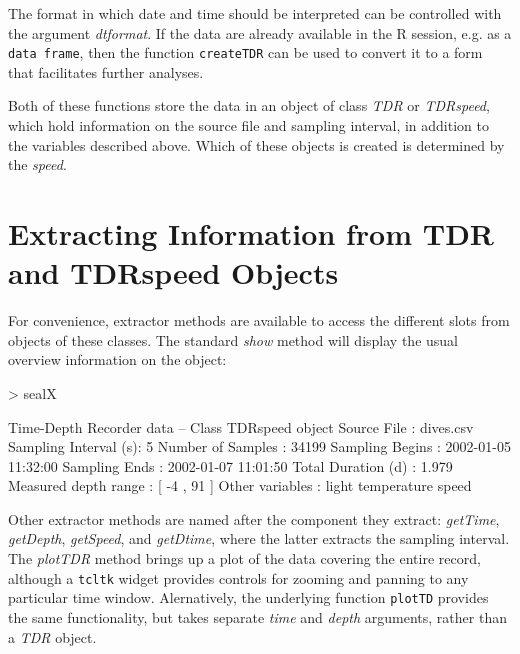 \documentclass[12pt, letterpaper]{scrartcl}
\newcommand{\Robject}[1]{{\texttt{#1}}}
\newcommand{\Rfunction}[1]{{\texttt{#1}}}
\newcommand{\Rpackage}[1]{{\texttt{#1}}}
\newcommand{\Rclass}[1]{{\textit{#1}}}
\newcommand{\Rmethod}[1]{{\textit{#1}}}
\newcommand{\Rfunarg}[1]{{\textit{#1}}}
\newcommand{\R}{{\normalfont\textsf{R }}{}}
\begin{document}
The format in which date and time should be interpreted can be controlled
with the argument \Rfunarg{dtformat}.  If the data are already available
in the \R{} session, e.g. as a \Robject{data frame}, then the function
\Rfunction{createTDR} can be used to convert it to a form that facilitates
further analyses.

Both of these functions store the data in an object of class \Rclass{TDR}
or \Rclass{TDRspeed}, which hold information on the source file and
sampling interval, in addition to the variables described above.  Which of
these objects is created is determined by the \Rfunarg{speed}.


\section{Extracting Information from TDR and TDRspeed Objects}
\label{sec:extract}

For convenience, extractor methods are available to access the different
slots from objects of these classes.  The standard \Rmethod{show} method
will display the usual overview information on the object:
\begin{Schunk}
\begin{Sinput}
> sealX
\end{Sinput}
\begin{Soutput}
Time-Depth Recorder data -- Class TDRspeed object
  Source File          : dives.csv 
  Sampling Interval (s): 5 
  Number of Samples    : 34199 
  Sampling Begins      : 2002-01-05 11:32:00 
  Sampling Ends        : 2002-01-07 11:01:50 
  Total Duration (d)   : 1.979 
  Measured depth range : [ -4 , 91 ]
  Other variables      : light temperature speed 
\end{Soutput}
\end{Schunk}

Other extractor methods are named after the component they extract:
\Rmethod{getTime}, \Rmethod{getDepth}, \Rmethod{getSpeed}, and
\Rmethod{getDtime}, where the latter extracts the sampling interval.  The
\Rmethod{plotTDR} method brings up a plot of the data covering the entire
record, although a \Rpackage{tcltk} widget provides controls for zooming
and panning to any particular time window.  Alernatively, the underlying
function \Rfunction{plotTD} provides the same functionality, but takes
separate \Rfunarg{time} and \Rfunarg{depth} arguments, rather than a
\Rclass{TDR} object.
\end{document}
